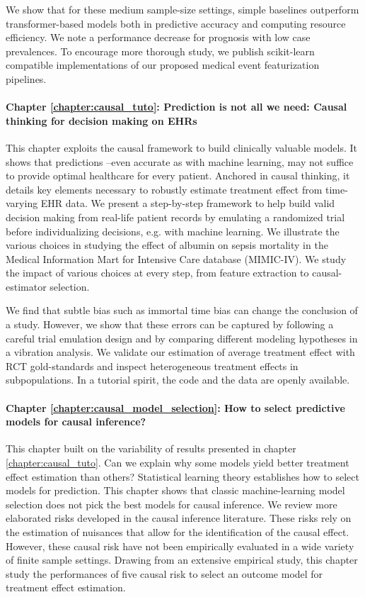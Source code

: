 \documentclass[french,12pt,twoside,a4paper]{book}
\begin{document}
We show that for these medium sample-size settings, simple baselines outperform
transformer-based models both in predictive accuracy and computing resource
efficiency. We note a performance decrease for prognosis with low case
prevalences. To encourage more thorough study, we publish scikit-learn
compatible implementations of our proposed medical event featurization pipelines.

\paragraph{Chapter \ref{chapter:causal_tuto}: Prediction is not all we need:
  Causal thinking for decision making on EHRs} This chapter exploits the causal
framework to build clinically valuable models. It shows that predictions
--even accurate as with machine learning, may not suffice to provide optimal
healthcare for every patient. Anchored in causal thinking, it details key
elements necessary to robustly estimate treatment effect from time-varying EHR
data. We present a step-by-step framework to help build valid decision making
from real-life patient records by emulating a randomized trial before
individualizing decisions, e.g. with machine learning. We illustrate the various
choices in studying the effect of albumin on sepsis mortality in the Medical
Information Mart for Intensive Care database (MIMIC-IV). We study the impact
of various choices at every step, from feature extraction to causal-estimator
selection.

We find that subtle bias such as immortal time bias can change the conclusion
of a study. However, we show that these errors can be captured by following a
careful trial emulation design and by comparing different modeling hypotheses
in a vibration analysis. We validate our estimation of average treatment
effect with RCT gold-standards and inspect heterogeneous treatment effects in
subpopulations. In a tutorial spirit, the code and the data are openly available.

\paragraph{Chapter \ref{chapter:causal_model_selection}: How to select
  predictive models for causal inference?} This chapter built on the variability
of results presented in chapter \ref{chapter:causal_tuto}. Can we explain why
some models yield better treatment effect estimation than others? Statistical
learning theory establishes how to select models for prediction. This chapter
shows that classic machine-learning model selection does not pick the
best models for causal inference. We review more elaborated risks developed in
the causal inference literature. These risks rely on the estimation of
nuisances that allow for the identification of the causal effect. However,
these causal risk have not been empirically evaluated in a wide variety of
finite sample settings. Drawing from an extensive empirical study, this
chapter study the performances of five causal risk to select an outcome model
for treatment effect estimation.
\end{document}
